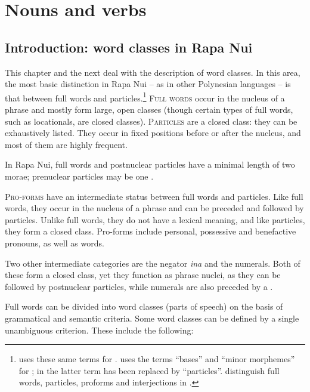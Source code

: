 \chapter[Nouns and verbs]{Nouns and verbs}\label{ch:3}
\section{Introduction: word classes in Rapa Nui}\label{sec:3.1}
This chapter and the next deal with the description of word classes. In this area, the most basic distinction in Rapa Nui – as in other Polynesian languages – is that between full words and particles.\footnote{\label{fn:86}\citet{Buse1965} uses these same terms for . \citet{Biggs1961} uses the terms “bases” and “minor morphemes” for ; in \citet{Biggs1973} the latter term has been replaced by “particles”. \citet[71]{MoselHovdhaugen1992} distinguish full words, particles, proforms and interjections in .} \textsc{Full words} occur in the nucleus of a phrase and mostly form large, open classes (though certain types of full words, such as locationals, are closed classes). \textsc{Particles} are a closed class: they can be exhaustively listed. They occur in fixed positions before or after the nucleus, and most of them are highly frequent.

In Rapa Nui, full words and postnuclear particles have a minimal length of two morae; prenuclear particles may be one .

\textsc{Pro-forms} have an intermediate status between full words and particles. Like full words, they occur in the nucleus of a phrase and can be preceded and followed by particles. Unlike full words, they do not have a lexical meaning, and like particles, they form a closed class. Pro-forms include personal, possessive and benefactive pronouns, as well as  words. 

Two other intermediate categories are the negator \textit{{\ꞌ}ina} and the numerals. Both of these form a closed class, yet they function as phrase nuclei, as they can be followed by postnuclear particles, while numerals are also preceded by a . 

Full words can be divided into word classes (parts of speech) on the basis of grammatical and semantic criteria. Some word classes can be defined by a single unambiguous criterion. These include the following:

